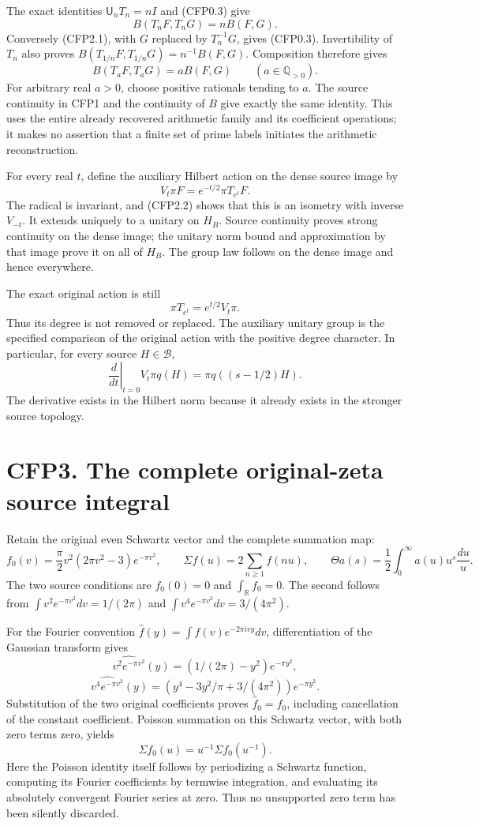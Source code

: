 The exact identities \(\mathsf U_nT_n=nI\) and (CFP0.3) give \[
B(T_nF,T_nG)=nB(F,G).
\tag{CFP2.1}
\] Conversely (CFP2.1), with \(G\) replaced by \(T_n^{-1}G\), gives
(CFP0.3). Invertibility of \(T_n\) also proves
\(B(T_{1/n}F,T_{1/n}G)=n^{-1}B(F,G)\). Composition therefore gives \[
B(T_aF,T_aG)=aB(F,G)\qquad(a\in\mathbb Q_{>0}).
\tag{CFP2.2}
\] For arbitrary real \(a>0\), choose positive rationals tending to
\(a\). The source continuity in CFP1 and the continuity of \(B\) give
exactly the same identity. This uses the entire already recovered
arithmetic family and its coefficient operations; it makes no assertion
that a finite set of prime labels initiates the arithmetic
reconstruction.

For every real \(t\), define the auxiliary Hilbert action on the dense
source image by \[
V_t\pi F=e^{-t/2}\pi T_{e^t}F.
\tag{CFP2.3}
\] The radical is invariant, and (CFP2.2) shows that this is an isometry
with inverse \(V_{-t}\). It extends uniquely to a unitary on \(H_B\).
Source continuity proves strong continuity on the dense image; the
unitary norm bound and approximation by that image prove it on all of
\(H_B\). The group law follows on the dense image and hence everywhere.

The exact original action is still \[
\boxed{\pi T_{e^t}=e^{t/2}V_t\pi.}
\tag{CFP2.4}
\] Thus its degree is not removed or replaced. The auxiliary unitary
group is the specified comparison of the original action with the
positive degree character. In particular, for every source
\(H\in\mathcal B\), \[
\left.\frac d{dt}\right|_{t=0}V_t\pi q(H)
=\pi q((s-1/2)H).
\tag{CFP2.5}
\] The derivative exists in the Hilbert norm because it already exists
in the stronger source topology.

\section{CFP3. The complete original-zeta source
integral}\label{cfp3.-the-complete-original-zeta-source-integral}

Retain the original even Schwartz vector and the complete summation map:
\[
f_0(v)=\frac\pi2v^2(2\pi v^2-3)e^{-\pi v^2},\qquad
\Sigma f(u)=2\sum_{n\ge1}f(nu),\qquad
\Theta a(s)=\frac12\int_0^\infty a(u)u^s\frac{du}{u}.
\tag{CFP3.1}
\] The two source conditions are \(f_0(0)=0\) and
\(\int_{\mathbb R}f_0=0\). The second follows from
\(\int v^2e^{-\pi v^2}dv=1/(2\pi)\) and
\(\int v^4e^{-\pi v^2}dv=3/(4\pi^2)\).

For the Fourier convention \(\widehat f(y)=\int f(v)e^{-2\pi ivy}dv\),
differentiation of the Gaussian transform gives \[
\widehat{v^2e^{-\pi v^2}}(y)
=(1/(2\pi)-y^2)e^{-\pi y^2},
\] \[
\widehat{v^4e^{-\pi v^2}}(y)
=(y^4-3y^2/\pi+3/(4\pi^2))e^{-\pi y^2}.
\tag{CFP3.2}
\] Substitution of the two original coefficients proves
\(\widehat f_0=f_0\), including cancellation of the constant
coefficient. Poisson summation on this Schwartz vector, with both zero
terms zero, yields \[
\Sigma f_0(u)=u^{-1}\Sigma f_0(u^{-1}).
\tag{CFP3.3}
\] Here the Poisson identity itself follows by periodizing a Schwartz
function, computing its Fourier coefficients by termwise integration,
and evaluating its absolutely convergent Fourier series at zero. Thus no
unsupported zero term has been silently discarded.

